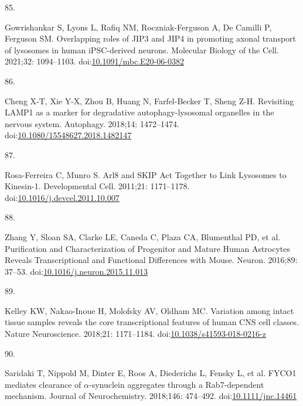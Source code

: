 \documentclass[
  12pt,
  a4paper,
]{book}
\newlength{\cslhangindent}
\newlength{\csllabelwidth}
\newlength{\cslentryspacingunit} %
\newenvironment{CSLReferences}[2] %
 {%
  \setlength{\parindent}{0pt}
  \ifodd #1
  \let\oldpar\par
  \def\par{\hangindent=\cslhangindent\oldpar}
  \fi
  \setlength{\parskip}{#2\cslentryspacingunit}
 }%
 {}
\newcommand{\CSLLeftMargin}[1]{\parbox[t]{\csllabelwidth}{#1}}
\newcommand{\CSLRightInline}[1]{\parbox[t]{\linewidth - \csllabelwidth}{#1}\break}
\begin{document}
\begin{CSLReferences}{0}{0}
\leavevmode{}%
\CSLLeftMargin{85. }%
\CSLRightInline{Gowrishankar S, Lyons L, Rafiq NM, Roczniak-Ferguson A, De Camilli P, Ferguson SM. Overlapping roles of {JIP3} and {JIP4} in promoting axonal transport of lysosomes in human {iPSC-derived} neurons. Molecular Biology of the Cell. 2021;32: 1094--1103. doi:\href{https://doi.org/10.1091/mbc.E20-06-0382}{10.1091/mbc.E20-06-0382}}

\leavevmode{}%
\CSLLeftMargin{86. }%
\CSLRightInline{Cheng X-T, Xie Y-X, Zhou B, Huang N, Farfel-Becker T, Sheng Z-H. Revisiting {LAMP1} as a marker for degradative autophagy-lysosomal organelles in the nervous system. Autophagy. 2018;14: 1472--1474. doi:\href{https://doi.org/10.1080/15548627.2018.1482147}{10.1080/15548627.2018.1482147}}

\leavevmode{}%
\CSLLeftMargin{87. }%
\CSLRightInline{Rosa-Ferreira C, Munro S. Arl8 and {SKIP Act Together} to {Link Lysosomes} to {Kinesin-1}. Developmental Cell. 2011;21: 1171--1178. doi:\href{https://doi.org/10.1016/j.devcel.2011.10.007}{10.1016/j.devcel.2011.10.007}}

\leavevmode{}%
\CSLLeftMargin{88. }%
\CSLRightInline{Zhang Y, Sloan SA, Clarke LE, Caneda C, Plaza CA, Blumenthal PD, et al. Purification and {Characterization} of {Progenitor} and {Mature Human Astrocytes Reveals Transcriptional} and {Functional Differences} with {Mouse}. Neuron. 2016;89: 37--53. doi:\href{https://doi.org/10.1016/j.neuron.2015.11.013}{10.1016/j.neuron.2015.11.013}}

\leavevmode{}%
\CSLLeftMargin{89. }%
\CSLRightInline{Kelley KW, Nakao-Inoue H, Molofsky AV, Oldham MC. Variation among intact tissue samples reveals the core transcriptional features of human {CNS} cell classes. Nature Neuroscience. 2018;21: 1171--1184. doi:\href{https://doi.org/10.1038/s41593-018-0216-z}{10.1038/s41593-018-0216-z}}

\leavevmode{}%
\CSLLeftMargin{90. }%
\CSLRightInline{Saridaki T, Nippold M, Dinter E, Roos A, Diederichs L, Fensky L, et al. {FYCO1} mediates clearance of {\(\alpha\)}-synuclein aggregates through a {Rab7-dependent} mechanism. Journal of Neurochemistry. 2018;146: 474--492. doi:\href{https://doi.org/10.1111/jnc.14461}{10.1111/jnc.14461}}


\end{CSLReferences}
\end{document}
